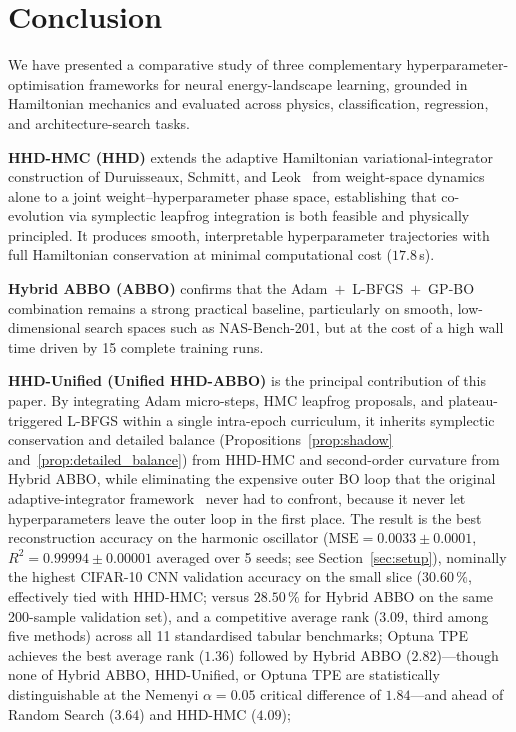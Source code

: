 \documentclass[11pt]{article}
\theoremstyle{definition}
\begin{document}

\section{Conclusion}

We have presented a comparative study of three complementary
hyperparameter-optimisation frameworks for neural energy-landscape
learning, grounded in Hamiltonian mechanics and evaluated across
physics, classification, regression, and architecture-search tasks.

\textbf{HHD-HMC (HHD)} extends the adaptive Hamiltonian
variational-integrator construction of Duruisseaux, Schmitt, and
Leok~\cite{duruisseaux2021adaptive} from weight-space dynamics alone
to a joint weight--hyperparameter phase space, establishing that
co-evolution via symplectic leapfrog integration is both feasible and
physically principled. It produces smooth, interpretable
hyperparameter trajectories with full Hamiltonian conservation at
minimal computational cost ($17.8$\,s).

\textbf{Hybrid ABBO (ABBO)} confirms that the Adam~$+$~L-BFGS~$+$~GP-BO
combination remains a strong practical baseline, particularly on
smooth, low-dimensional search spaces such as NAS-Bench-201, but at
the cost of a high wall time driven by 15 complete training runs.

\textbf{HHD-Unified (Unified HHD-ABBO)} is the principal contribution of
this paper. By integrating Adam micro-steps, HMC leapfrog proposals,
and plateau-triggered L-BFGS within a single intra-epoch curriculum,
it inherits symplectic conservation and detailed balance
(Propositions~\ref{prop:shadow} and~\ref{prop:detailed_balance}) from
HHD-HMC and second-order curvature from Hybrid ABBO, while eliminating
the expensive outer BO loop that the original adaptive-integrator
framework~\cite{duruisseaux2021adaptive} never had to confront,
because it never let hyperparameters leave the outer loop in the
first place. The result is the best reconstruction accuracy on the
harmonic oscillator ($\mathrm{MSE}=0.0033 \pm 0.0001$, $R^2=0.99994 \pm 0.00001$
averaged over 5 seeds; see Section~\ref{sec:setup}),
nominally the highest CIFAR-10 CNN validation accuracy on the
small slice ($30.60\,\%$, effectively tied with HHD-HMC; versus
$28.50\,\%$ for
Hybrid ABBO on the same 200-sample validation set), and a competitive average
rank ($3.09$, third among five methods) across all 11 standardised
tabular benchmarks; Optuna TPE achieves the best average rank
($1.36$) followed by Hybrid ABBO ($2.82$)---though none of Hybrid ABBO, HHD-Unified, or Optuna TPE are statistically distinguishable at the Nemenyi
$\alpha=0.05$ critical difference of $1.84$---and ahead of
Random Search ($3.64$) and HHD-HMC ($4.09$);
\end{document}
